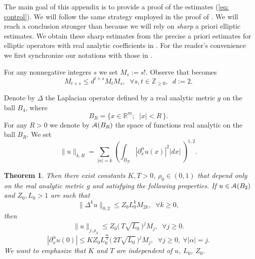 \documentclass[reqno, 11pt]{amsart}
\newtheorem{theorem}{Theorem}[section]
\theoremstyle{definition}
\numberwithin{equation}{section}
\begin{document}
The  main goal of this appendix is to provide a proof of the  estimates (\ref{eq: control}). We will  follow    the same  strategy  employed  in the proof of \cite[Thm. 17.5.3]{Ho3}. We  will reach  a  conclusion  stronger than  \cite[Thm. 17.5.3]{Ho3} because we will rely on   \emph{sharp} a priori elliptic estimates.   We obtain  these sharp estimates from  the precise a priori estimates for elliptic   operators with real analytic  coefficients  in \cite[Chap. 8]{LM}.    For the reader's convenience we first  synchronize our notations with those in  \cite{LM}.

For any  nonnegative integers $s$ we set $M_s:= s!$. Observe that  \cite[Chap. 8, Eq. (1.10)]{LM} becomes
\begin{equation}
M_{t+s}\leq d^{t+s} M_tM_s,\;\;\forall s,t\in{{\mathbb Z}}_{\geq 0},\;\;d:=2.
\label{eq: e1}
\end{equation}
 
Denote by  $\Delta$    the Laplacian operator defined by a real analytic metric $g$ on the   ball  $B_4$, where 
 \[
 B_{R}=\bigl\{ x\in {{\mathbb R}}^m;\;\; |x|<R\,\bigr\}.
 \]
   For  any $R>0$ we denote by ${\EuScript{A}}(B_R)$ the space of  functions real analytic on the ball  $B_R$. We set
   \begin{equation}
   \|u\|_{k,R}=\sum_{|\alpha|=k}\left(\int_{B_R} |{\partial}^\alpha_x u(x)|^2 |dx|\,\right)^{1,2}.
   \label{eq: sobo}
   \end{equation}
   
  \begin{theorem}  
  Then there exist constants $K,T>0$, $\rho_0\in (0,1) $ that  depend only on the real analytic metric $g$  and satisfying the following properties. If  $u\in {\EuScript{A}}(B_2)$  and     $Z_0,L_0>1$ are  such that
  \begin{equation}
  \|\Delta^k u\|_{0,2}\leq Z_0L_0^k M_{2k},\;\;\forall k\geq 0,
  \label{eq: e0}
  \end{equation}  
  then 
  \begin{equation}
  \|u\|_{j,\rho_0}\leq  Z_0 \bigl(\, T\sqrt{L_0}\,\bigr)^j M_j,\;\;\forall j\geq 0.
  \label{eq: fundamental}
  \end{equation}
  \begin{equation}
  |{\partial}^\alpha_xu(0)|\leq K Z_0L_0^{\frac{m}{4}}\bigl(\, 2T\sqrt{L_0}\,\bigr)^j M_j ,\;\;\forall j\geq0,\;\forall |\alpha|=j. 
  \label{eq: fundamental2}
  \end{equation}
  We want to emphasize that $K$ and $T$ are \emph{independent} of $u$, $L_0$, $Z_0$.
  \label{th: fund}
  \end{theorem}
  
\end{document}
